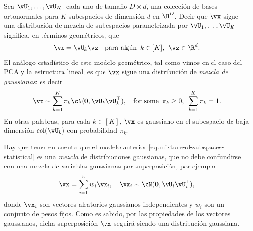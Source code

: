 \documentclass[../../book-main.tex]{subfiles}
\begin{document}
Sea $\vU_1, \dots, \vU_K$, cada uno de tamaño $D \times d$, una 
colección de bases ortonormales para $K$ subespacios de dimensión $d$ en $\R^D$.
Decir que $\vx$ sigue una distribución de mezcla de subespacios
parametrizada por $\vU_1, \dots, \vU_K$ significa, en términos geométricos,
que
\begin{equation}\label{eq:mixture-of-subspaces-geometric}
    \vx = \vU_k \vz  \quad \text{para algún} \enspace k \in
    [K],\enspace \vz \in \R^d.
\end{equation}
El análogo estadístico de este modelo geométrico, tal como vimos en el
caso del PCA y la estructura lineal,
es que $\vx$ sigue una distribución de \textit{mezcla de gaussianas}: es decir,
\begin{equation}\label{eq:mixture-of-subspaces-statistical}
    \vx \sim \sum_{k=1}^K \pi_k \cN(\mathbf{0}, \vU_k\vU_k^\top),
    \quad \text{for some} \enspace \pi_k \geq 0,\enspace \sum_{k=1}^K \pi_k = 1.
\end{equation}
En otras palabras, para cada $k \in [K]$, $\vx$ es gaussiano en el subespacio de baja dimensión
$\mathop{\mathrm{col}}(\vU_k)$ con probabilidad $\pi_k$.

\begin{remark}
    Hay que tener en cuenta que el modelo anterior
    \eqref{eq:mixture-of-subspaces-statistical} es una \textit{mezcla} de
    distribuciones gaussianas, que no debe confundirse con una mezcla de variables gaussianas
    por superposición, por ejemplo
    \begin{equation}
        \vx = \sum_{i=1}^n w_i \vx_i, \quad \vx_i \sim
        \cN(\mathbf{0}, \vU_i\vU_i^\top),
    \end{equation}
    donde $\vx_i$ son vectores aleatorios gaussianos independientes y $w_i$
    son un conjunto de pesos fijos. Como es sabido, por las propiedades de
    los vectores gaussianos, dicha superposición $\vx$ seguirá siendo una
    distribución gaussiana.
\end{remark}
\end{document}
